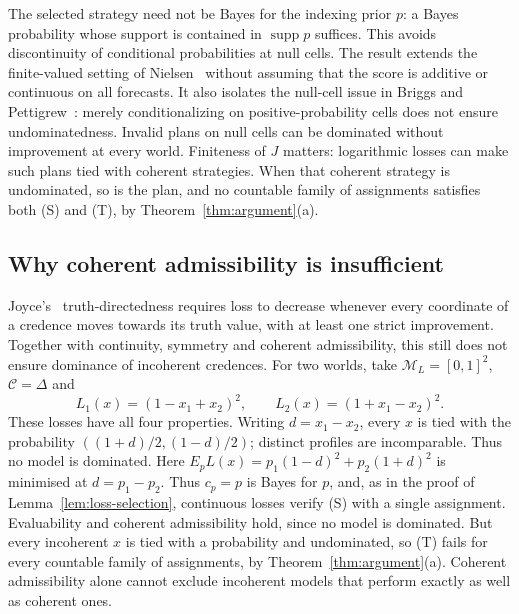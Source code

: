 \documentclass[11pt]{article}
\theoremstyle{definition}
\theoremstyle{remark}
\newcommand{\M}{\mathcal M}
\newcommand{\C}{\mathcal C}
\newcommand{\supp}{\operatorname{supp}}
\begin{document}
The selected strategy need not be Bayes for the indexing prior $p$: a Bayes probability whose support is contained in $\supp p$ suffices. This avoids discontinuity of conditional probabilities at null cells. The result extends the finite-valued setting of Nielsen~\cite{Nielsen2021} without assuming that the score is additive or continuous on all forecasts. It also isolates the null-cell issue in Briggs and Pettigrew~\cite{Briggs2020}: merely conditionalizing on positive-probability cells does not ensure undominatedness. Invalid plans on null cells can be dominated without improvement at every world. Finiteness of $J$ matters: logarithmic losses can make such plans tied with coherent strategies. {\color{red}When that coherent strategy is undominated, so is the plan, and no countable family of assignments satisfies both {\color{red}(S)} and {\color{red}(T)}, by Theorem~\ref{thm:argument}(a).}

\subsection{Why coherent admissibility is insufficient}
Joyce's~\cite{Joyce2009} truth-directedness requires loss to decrease whenever every coordinate of a credence moves towards its truth value, with at least one strict improvement. Together with continuity, symmetry and coherent admissibility, this still does not ensure dominance of incoherent credences. For two worlds, take $\M_L=[0,1]^2$, $\C=\Delta$ and
\[
L_1(x)=(1-x_1+x_2)^2,\qquad L_2(x)=(1+x_1-x_2)^2.
\]
These losses have all four properties. Writing $d=x_1-x_2$, every $x$ is tied with the probability $((1+d)/2,(1-d)/2)$; distinct profiles are incomparable. Thus no model is dominated. Here $E_pL(x)=p_1(1-d)^2+p_2(1+d)^2$ is minimised at $d=p_1-p_2$. {\color{red}Thus $c_p=p$ is Bayes for $p$, and, as in the proof of Lemma~\ref{lem:loss-selection}, continuous losses verify {\color{red}(S)} with a single assignment. Evaluability and coherent admissibility hold, since no model is dominated. But every incoherent $x$ is tied with a probability and undominated, so {\color{red}(T)} fails for every countable family of assignments, by Theorem~\ref{thm:argument}(a).} Coherent admissibility alone cannot exclude incoherent models that perform exactly as well as coherent ones.
\end{document}
